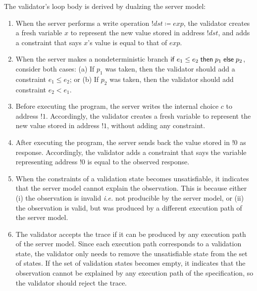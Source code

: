 The validator's loop body is derived by dualzing the server model:
\begin{enumerate}
\item \label{rule:write} When the server performs a write operation
  $!dst\coloneqq exp$, the validator creates a fresh variable $x$ to represent
  the new value stored in address $!dst$, and adds a constraint that says $x$'s
  value is equal to that of $exp$.
\item \label{rule:branch} When the server makes a nondeterministic branch $\mathsf{if}\;
  e_1\le e_2\;\mathsf{then}\; p_1\;\mathsf{else}\; p_2$, consider both cases: (a) If $p_1$ was taken,
  then the validator should add a constraint $e_1\le e_2$; or (b) If $p_2$ was
  taken, then the validator should add constraint $e_2<e_1$.
\item \label{rule:choice} Before executing the program, the server writes the internal
    choice $c$ to address $!1$.  Accordingly, the validator creates a fresh
    variable to represent the new value stored in address $!1$, without adding
    any constraint.
\item \label{rule:return} After executing the program, the server sends back the
  value stored in $!0$ as response.  Accordingly, the validator adds a
  constraint that says the variable representing address $!0$ is equal to the
  observed response.
\item \label{rule:unsat} When the constraints of a validation state becomes
  unsatisfiable, it indicates that the server model cannot explain the
  observation.  This is because either (i) the observation is invalid {\it i.e.}
  not producible by the server model, or (ii) the observation is valid, but was
  produced by a different execution path of the server model.
\item \label{rule:reject} The validator accepts the trace if it can be produced
  by any execution path of the server model.  Since each execution path
  corresponds to a validation state, the validator only needs to remove the
  unsatisfiable state from the set of states.  If the set of validation states
  becomes empty, it indicates that the observation cannot be explained by any
  execution path of the specification, so the validator should reject the trace.
\end{enumerate}

